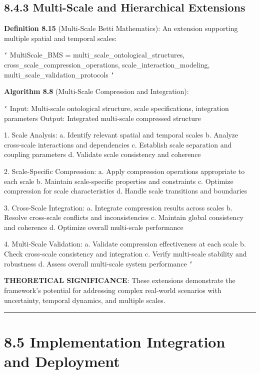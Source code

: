 \subsection{8.4.3 Multi-Scale and Hierarchical Extensions}

\textbf{Definition 8.15} (Multi-Scale Betti Mathematics): An extension supporting multiple spatial and temporal scales:

\texttt{`}
MultiScale_BMS = {
    multi_scale_ontological_structures,
    cross_scale_compression_operations,
    scale_interaction_modeling,
    multi_scale_validation_protocols
}
\texttt{`}

\textbf{Algorithm 8.8} (Multi-Scale Compression and Integration):

\texttt{`}
Input: Multi-scale ontological structure, scale specifications, integration parameters
Output: Integrated multi-scale compressed structure

1. Scale Analysis:
   a. Identify relevant spatial and temporal scales
   b. Analyze cross-scale interactions and dependencies
   c. Establish scale separation and coupling parameters
   d. Validate scale consistency and coherence
   
2. Scale-Specific Compression:
   a. Apply compression operations appropriate to each scale
   b. Maintain scale-specific properties and constraints
   c. Optimize compression for scale characteristics
   d. Handle scale transitions and boundaries
   
3. Cross-Scale Integration:
   a. Integrate compression results across scales
   b. Resolve cross-scale conflicts and inconsistencies
   c. Maintain global consistency and coherence
   d. Optimize overall multi-scale performance
   
4. Multi-Scale Validation:
   a. Validate compression effectiveness at each scale
   b. Check cross-scale consistency and integration
   c. Verify multi-scale stability and robustness
   d. Assess overall multi-scale system performance
\texttt{`}

\textbf{THEORETICAL SIGNIFICANCE}: These extensions demonstrate the framework's potential for addressing complex real-world scenarios with uncertainty, temporal dynamics, and multiple scales.

\hrule

\section{8.5 Implementation Integration and Deployment}

